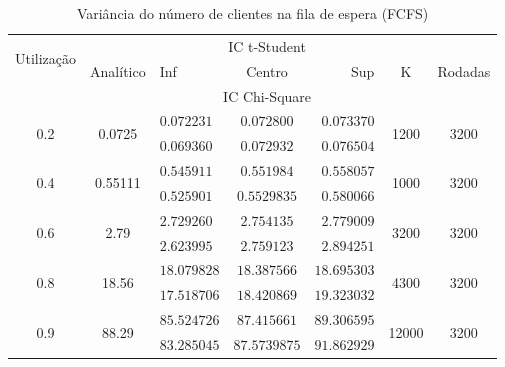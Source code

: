 \documentclass[a4paper]{article}
\begin{document}
\begin{table}[h!]
    \centering
    \begin{tabular}{|c|c|lcr|c|c|}\hline
        \multirow{2}{4.35em}{Utilização}
            & \multirow{3}{3.95em}{Analítico}
            & \multicolumn{3}{|c|}{IC t-Student}
            & \multirow{3}{1em}{K}
            & \multirow{3}{3.75em}{Rodadas} \\
        && Inf & Centro & Sup &&\\
        && \multicolumn{3}{|c|}{IC Chi-Square} &&\\\hline
        \multirow{2}{2em}{0.2}
            &\multirow{2}{3em}{0.0725}
            &$ 0.072231 $&$ 0.072800 $&$ 0.073370 $
            &\multirow{2}{2em}{1200} & \multirow{2}{2em}{3200}\\
            &&$ 0.069360 $&$ 0.072932 $&$ 0.076504 $&&\\\hline
        \multirow{2}{2em}{0.4}
            &\multirow{2}{3em}{0.55111}
            &$ 0.545911 $&$ 0.551984 $&$ 0.558057 $
            &\multirow{2}{2em}{1000} & \multirow{2}{2em}{3200}\\
            &&$ 0.525901 $&$ 0.5529835 $&$ 0.580066 $&&\\\hline
        \multirow{2}{2em}{0.6}
            &\multirow{2}{2em}{2.79}
            &$ 2.729260 $&$ 2.754135 $&$ 2.779009 $
            &\multirow{2}{2em}{3200} & \multirow{2}{2em}{3200}\\
            &&$ 2.623995 $&$ 2.759123 $&$ 2.894251 $&&\\\hline
        \multirow{2}{2em}{0.8}
            &\multirow{2}{2em}{18.56}
            &$ 18.079828 $&$ 18.387566 $&$ 18.695303 $
            &\multirow{2}{2em}{4300} & \multirow{2}{2em}{3200}\\
            &&$ 17.518706 $&$ 18.420869 $&$ 19.323032 $&&\\\hline
        \multirow{2}{2em}{0.9}
            &\multirow{2}{2em}{88.29}
            &$ 85.524726 $&$ 87.415661 $&$ 89.306595 $
            &\multirow{2}{2.5em}{12000} & \multirow{2}{2em}{3200}\\
            &&$ 83.285045 $&$ 87.5739875 $&$ 91.862929 $&&\\\hline
    \end{tabular}
    \caption{Variância do número de clientes
    na fila de espera (FCFS)}
\end{table}
\end{document}
